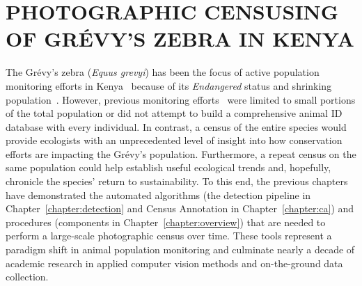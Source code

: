 \chapter{PHOTOGRAPHIC CENSUSING OF GR\'EVY'S ZEBRA IN KENYA} \label{chapter:censusing}

\noindent The Gr\'evy's zebra (\textit{Equus grevyi}) has been the focus of active population monitoring efforts in Kenya~\cite{juang_energy-efficient_2002,lahiri_biometric_2011} because of its \textit{Endangered} status and shrinking population~\cite{rubenstein_equus_2016}.  However, previous monitoring efforts~\cite{ogutu_changing_2013,ngene_total_2013} were limited to small portions of the total population or did not attempt to build a comprehensive animal ID database with every individual.  In contrast, a census of the entire species would provide ecologists with an unprecedented level of insight into how conservation efforts are impacting the Gr\'evy's population.  Furthermore, a repeat census on the same population could help establish useful ecological trends and, hopefully, chronicle the species' return to sustainability.  To this end, the previous chapters have demonstrated the automated algorithms (the detection pipeline in Chapter~\ref{chapter:detection} and Census Annotation in Chapter~\ref{chapter:ca}) and procedures (components in Chapter~\ref{chapter:overview}) that are needed to perform a large-scale photographic census over time.  These tools represent a paradigm shift in animal population monitoring and culminate nearly a decade of academic research in applied computer vision methods and on-the-ground data collection.

